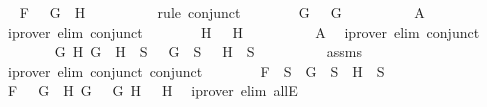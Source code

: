 \begin{isabellebody}
\ \isamarkupfalse%
\ {\isachardoublequoteopen}F\ {\isacharequal}\ \isactrlbold {\isasymnot}\ {\isacharparenleft}G{}\ \isactrlbold {\isasymor}\ H{}{\isacharparenright}{\isachardoublequoteclose}\isanewline
\ \ \ \ \ \ \ \ \isamarkupfalse%
\ {\isacharparenleft}rule\ conjunct{}{\isacharparenright}\isanewline
\ \ \ \ \ \ \isamarkupfalse%
\ {\isachardoublequoteopen}G\ {\isacharequal}\ \isactrlbold {\isasymnot}\ G{}{\isachardoublequoteclose}\isanewline
\ \ \ \ \ \ \ \ \isamarkupfalse%
\ A{}\ \isamarkupfalse%
\ {\isacharparenleft}iprover\ elim{\isacharcolon}\ conjunct{}{\isacharparenright}\isanewline
\ \ \ \ \ \ \isamarkupfalse%
\ {\isachardoublequoteopen}H\ {\isacharequal}\ \isactrlbold {\isasymnot}\ H{}{\isachardoublequoteclose}\isanewline
\ \ \ \ \ \ \ \ \isamarkupfalse%
\ A{}\ \isamarkupfalse%
\ {\isacharparenleft}iprover\ elim{\isacharcolon}\ conjunct{}{\isacharparenright}\isanewline
\ \ \ \ \ \ \isamarkupfalse%
\ {\isachardoublequoteopen}{\isasymforall}G\ H{\isachardot}\ \isactrlbold {\isasymnot}{\isacharparenleft}G\ \isactrlbold {\isasymor}\ H{\isacharparenright}\ {\isasymin}\ S\ {\isasymlongrightarrow}\ \isactrlbold {\isasymnot}\ G\ {\isasymin}\ S\ {\isasymand}\ \isactrlbold {\isasymnot}\ H\ {\isasymin}\ S{\isachardoublequoteclose}\isanewline
\ \ \ \ \ \ \ \ \isamarkupfalse%
\ assms\ \isamarkupfalse%
\ {\isacharparenleft}iprover\ elim{\isacharcolon}\ conjunct{}\ conjunct{}{\isacharparenright}\isanewline
\ \ \ \ \ \ \isamarkupfalse%
\ {\isachardoublequoteopen}F\ {\isasymin}\ S\ {\isasymlongrightarrow}\ G\ {\isasymin}\ S\ {\isasymand}\ H\ {\isasymin}\ S{\isachardoublequoteclose}\isanewline
\ \ \ \ \ \ \ \ \isamarkupfalse%
\ {\isacartoucheopen}F\ {\isacharequal}\ \isactrlbold {\isasymnot}\ {\isacharparenleft}G{}\ \isactrlbold {\isasymor}\ H{}{\isacharparenright}{\isacartoucheclose}\ {\isacartoucheopen}G\ {\isacharequal}\ \isactrlbold {\isasymnot}\ G{}{\isacartoucheclose}\ {\isacartoucheopen}H\ {\isacharequal}\ \isactrlbold {\isasymnot}\ H{}{\isacartoucheclose}\ \isamarkupfalse%
\ {\isacharparenleft}iprover\ elim{\isacharcolon}\ allE{\isacharparenright}\isanewline
\ \ \ \ \isamarkupfalse%
\isanewline
\ \ \ \ \ \ \isamarkupfalse%

\end{isabellebody}
